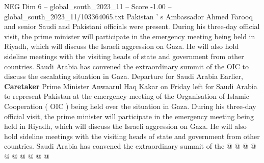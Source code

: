 \begin{textsample}{NEG Dim 6 – global\_south\_2023\_11 – Score -1.00 – global\_south\_2023\_11/103364065.txt}
Pakistan ' s Ambassador Ahmed Farooq and senior Saudi and Pakistani officials were present.
During his three-day official visit, the prime minister will participate in the emergency meeting being held in Riyadh, which will discuss the Israeli aggression on Gaza.
He will also hold sideline meetings with the visiting heads of state and government from other countries.
Saudi Arabia has convened the extraordinary summit of the OIC to discuss the escalating situation in Gaza.
Departure for Saudi Arabia Earlier, \textbf{Caretaker} Prime Minister Anwaarul Haq Kakar on Friday left for Saudi Arabia to represent Pakistan at the emergency meeting of the Organisation of Islamic Cooperation ( OIC ) being held over the situation in Gaza.
During his three-day official visit, the prime minister will participate in the emergency meeting being held in Riyadh, which will discuss the Israeli aggression on Gaza.
He will also hold sideline meetings with the visiting heads of state and government from other countries.
Saudi Arabia has convened the extraordinary summit of the @ @ @ @ @ @ @ @ @ @

\end{textsample}
